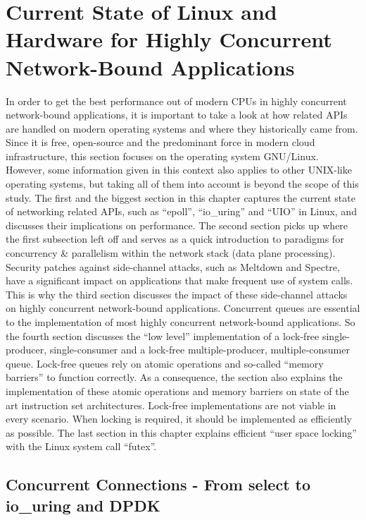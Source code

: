 \chapter{Current State of Linux and Hardware for Highly Concurrent Network-Bound Applications}
In order to get the best performance out of modern CPUs in highly concurrent network-bound applications, it is important to take a look at how related APIs are handled on modern operating systems and where they historically came from. Since it is free, open-source and the predominant force in modern cloud infrastructure, this section focuses on the operating system GNU/Linux. However, some information given in this context also applies to other UNIX-like operating systems, but taking all of them into account is beyond the scope of this study. \newline
The first and the biggest section in this chapter captures the current state of networking related APIs, such as “epoll”, “io\_uring” and “UIO” in Linux, and discusses their implications on performance. \newline
The second section picks up where the first subsection left off and serves as a quick introduction to paradigms for concurrency \& parallelism within the network stack (data plane processing). \newline
Security patches against side-channel attacks, such as Meltdown and Spectre, have a significant impact on applications that make frequent use of system calls. This is why the third section discusses the impact of these side-channel attacks on highly concurrent network-bound applications. \newline
Concurrent queues are essential to the implementation of most highly concurrent network-bound applications. So the fourth section discusses the “low level” implementation of a lock-free single-producer, single-consumer and a lock-free multiple-producer, multiple-consumer queue. Lock-free queues rely on atomic operations and so-called “memory barriers” to function correctly. As a consequence, the section also explains the implementation of these atomic operations and memory barriers on state of the art instruction set architectures. \newline
Lock-free implementations are not viable in every scenario. When locking is required, it should be implemented as efficiently as possible. The last section in this chapter explains efficient “user space locking” with the Linux system call “futex”.
\section{Concurrent Connections - From select to io\_uring and DPDK}
